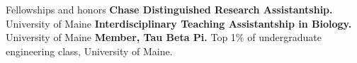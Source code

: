 \begin{rubric}{Fellowships and honors}
\entry*[2016]%
	\textbf{Chase Distinguished Research Assistantship.} University of Maine
%
\entry*[2015]%
	\textbf{Interdisciplinary Teaching Assistantship in Biology.} University of Maine
% 
%
	\textbf{Member, Tau Beta Pi.} Top 1\% of undergraduate engineering class, University of Maine.
\end{rubric}